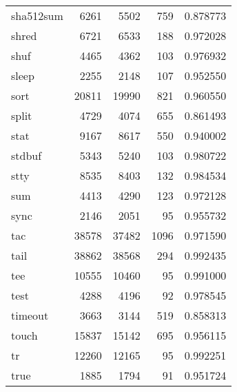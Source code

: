 \begin{longtable}{lrrrr}
sha512sum &                     6261 &         5502 &           759 &                 0.878773 \\
shred     &                     6721 &         6533 &           188 &                 0.972028 \\
shuf      &                     4465 &         4362 &           103 &                 0.976932 \\
sleep     &                     2255 &         2148 &           107 &                 0.952550 \\
sort      &                    20811 &        19990 &           821 &                 0.960550 \\
split     &                     4729 &         4074 &           655 &                 0.861493 \\
stat      &                     9167 &         8617 &           550 &                 0.940002 \\
stdbuf    &                     5343 &         5240 &           103 &                 0.980722 \\
stty      &                     8535 &         8403 &           132 &                 0.984534 \\
sum       &                     4413 &         4290 &           123 &                 0.972128 \\
sync      &                     2146 &         2051 &            95 &                 0.955732 \\
tac       &                    38578 &        37482 &          1096 &                 0.971590 \\
tail      &                    38862 &        38568 &           294 &                 0.992435 \\
tee       &                    10555 &        10460 &            95 &                 0.991000 \\
test      &                     4288 &         4196 &            92 &                 0.978545 \\
timeout   &                     3663 &         3144 &           519 &                 0.858313 \\
touch     &                    15837 &        15142 &           695 &                 0.956115 \\
tr        &                    12260 &        12165 &            95 &                 0.992251 \\
true      &                     1885 &         1794 &            91 &                 0.951724 \\

\end{longtable}
